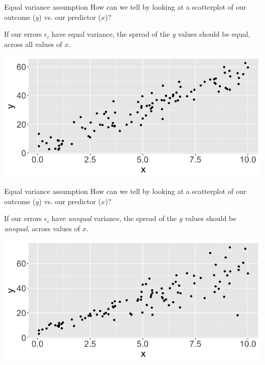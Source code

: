 \documentclass[10pt,t]{beamer}
\begin{document}
\begin{frame}{Equal variance assumption}
How can we tell by looking at a scatterplot of our outcome ($y$) vs. our predictor ($x$)?

\vspace{0.3cm}

If our errors $\epsilon_i$ have equal variance, the spread of the $y$ values should be equal, across all values of $x$.

\vspace{0.3cm}
\centering

\includegraphics[scale=0.3]{constvar.png}

\end{frame}

\begin{frame}{Equal variance assumption}
How can we tell by looking at a scatterplot of our outcome ($y$) vs. our predictor ($x$)?

\vspace{0.3cm}

If our errors $\epsilon_i$ have \textit{unequal} variance, the spread of the $y$ values should be \textit{unequal}, across values of $x$.

\vspace{0.3cm}
\centering

\includegraphics[scale=0.3]{nonconstvar.png}

\end{frame}
\end{document}
